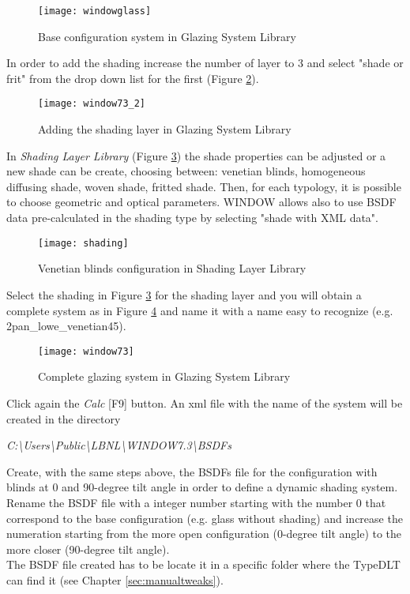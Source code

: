 \begin{figure}[h]
\centering
\texttt{[image: windowglass]}
\caption{\label{img2:windowglass} Base configuration system in Glazing System Library}
\end{figure}

In order to add the shading increase the number of layer to 3 and select "shade or frit" from the drop down list for the first (Figure \ref{img2:window73_2}).
\begin{figure}[h]
\centering
\texttt{[image: window73\_2]}
\caption{\label{img2:window73_2} Adding the shading layer in Glazing System Library}
\end{figure}

In \textit{Shading Layer Library} (Figure \ref{img2:shading}) the shade properties can be adjusted or a new shade can be create, choosing between: venetian blinds, homogeneous diffusing shade, woven shade, fritted shade. Then, for each typology, it is possible to choose geometric and optical parameters. WINDOW allows also to use BSDF data pre-calculated in the shading type by selecting "shade with XML data". 

\begin{figure}[h]
\centering
\texttt{[image: shading]}
\caption{\label{img2:shading} Venetian blinds configuration in Shading Layer Library}
\end{figure}

Select the shading in Figure \ref{img2:shading} for the shading layer and you will obtain a complete system as in Figure \ref{img2:window73} and name it with a name easy to recognize (e.g. 2pan\_lowe\_venetian45).

\begin{figure}[h]
\centering
\texttt{[image: window73]}
\caption{\label{img2:window73} Complete glazing system in Glazing System Library}
\end{figure}

Click again the \textit{Calc} [F9] button. An xml file with the name of the system will be created in the directory
\begin{center}
\textit{C:\textbackslash Users\textbackslash Public\textbackslash LBNL\textbackslash WINDOW7.3\textbackslash BSDFs}
\end{center}

Create, with the same steps above, the BSDFs file for the configuration with blinds at 0 and 90-degree tilt angle in order to define a dynamic shading system.\\
Rename the BSDF file with a integer number starting with the number 0 that correspond to the base configuration (e.g. glass without shading) and increase the numeration starting from the more open configuration (0-degree tilt angle) to the more closer (90-degree tilt angle). \\
The BSDF file created has to be locate it in a specific folder where the TypeDLT can find it (see Chapter \ref{sec:manualtweaks}).\\